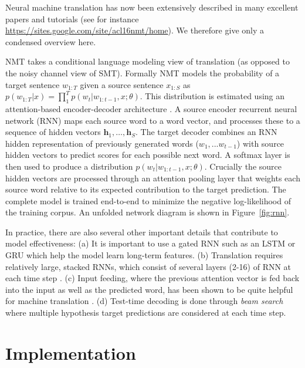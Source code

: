 \documentclass[11pt]{article}
\begin{document}
Neural machine translation has now been extensively described in many
excellent papers and tutorials (see for instance
\url{https://sites.google.com/site/acl16nmt/home}). We therefore give
only a condensed overview here. 

NMT takes a conditional language modeling view of translation (as
opposed to the noisy channel view of SMT). Formally NMT models the
probability of a target sentence $w_{1:T}$ given a source sentence
$x_{1:S}$ as
$p(w_{1:T}| x) = \prod_{1}^T p(w_t| w_{1:t-1}, x; \theta)$. This
distribution is estimated using an attention-based encoder-decoder
architecture \cite{Bahdanau2015}. A source encoder recurrent neural
network (RNN) maps each source word to a word vector, and processes
these to a sequence of hidden vectors
$\mathbf{h}_1, \ldots, \mathbf{h}_S$.  The target decoder combines an
RNN hidden representation of previously generated words
($w_1, ... w_{t-1}$) with source hidden vectors to predict scores for
each possible next word. A softmax layer is then used to produce a
distribution $ p(w_t| w_{1:t-1}, x; \theta)$. Crucially the source
hidden vectors are processed through an attention pooling layer that
weights each source word relative to its expected contribution to the
target prediction. The complete model is trained end-to-end to
minimize the negative log-likelihood of the training corpus. An
unfolded network diagram is shown in
Figure~\ref{fig:rnn}.


In practice, there are also several other important details that
contribute to model effectiveness: (a) It is important to use a gated
RNN such as an LSTM \cite{hochreiter1997long} or GRU
\cite{chung2014empirical} which help the model learn long-term
features. (b) Translation requires relatively large, stacked RNNs,
which consist of several layers (2-16) of RNN at each time step
\cite{sutskever14sequence}. (c) Input feeding, where the previous
attention vector is fed back into the input as well as the predicted
word, has been shown to be quite helpful for machine translation
\cite{Luong2015}.  (d) Test-time decoding is done through \textit{beam
  search} where multiple hypothesis target predictions are considered
at each time step. 






\section{Implementation}
\end{document}

